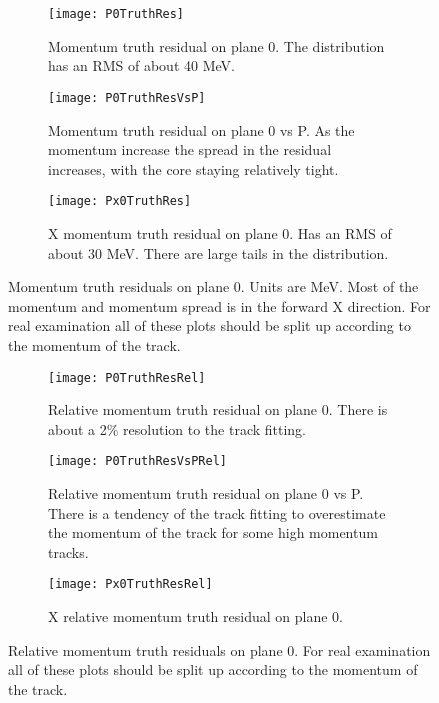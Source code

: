 \begin{figure}
    \centering
    \begin{subfigure}[]{0.6\textwidth}
        \centering
        \texttt{[image: P0TruthRes]} 
        \caption{Momentum truth residual on plane 0. The distribution has an RMS of about 40 MeV.}
    \end{subfigure}

    \begin{subfigure}[]{0.6\textwidth}
        \centering
        \texttt{[image: P0TruthResVsP]} 
        \caption{Momentum truth residual on plane 0 vs P. As the momentum increase the spread in the residual increases, with the core staying relatively tight.}
    \end{subfigure}
    
    \begin{subfigure}[]{0.6\textwidth}
        \centering
        \texttt{[image: Px0TruthRes]} 
        \caption{X momentum truth residual on plane 0. Has an RMS of about 30 MeV. There are large tails in the distribution.}
    \end{subfigure}

    \caption{Momentum truth residuals on plane 0. Units are MeV. Most of the momentum and momentum spread is in the forward X direction. For real examination all of these plots should be split up according to the momentum of the track.}
\end{figure}


\begin{figure}
    \centering
    \begin{subfigure}[]{0.6\textwidth}
        \centering
        \texttt{[image: P0TruthResRel]} 
        \caption{Relative momentum truth residual on plane 0. There is about a 2\% resolution to the track fitting.}
    \end{subfigure}

    \begin{subfigure}[]{0.6\textwidth}
        \centering
        \texttt{[image: P0TruthResVsPRel]} 
        \caption{Relative momentum truth residual on plane 0 vs P. There is a tendency of the track fitting to overestimate the momentum of the track for some high momentum tracks.}
    \end{subfigure}
    
    \begin{subfigure}[]{0.6\textwidth}
        \centering
        \texttt{[image: Px0TruthResRel]} 
        \caption{X relative momentum truth residual on plane 0.}
    \end{subfigure}

    \caption{Relative momentum truth residuals on plane 0. For real examination all of these plots should be split up according to the momentum of the track.}
\end{figure}



